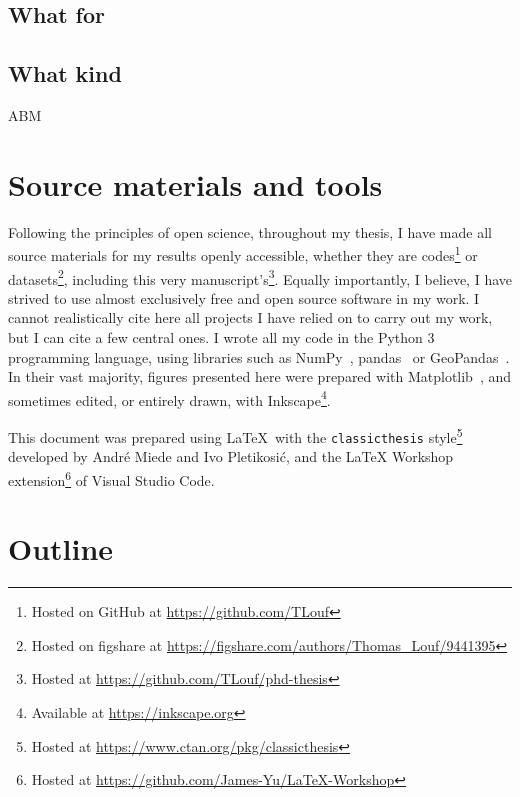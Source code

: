 \documentclass[../thesis.tex]{subfiles}
\begin{document}
\subsection{What for}

\subsection{What kind}



\ac{ABM}


\section{Source materials and tools}
Following the principles of open science, throughout my thesis, I have made all source
materials for my results openly accessible, whether they are codes\footnote{Hosted on
GitHub at \url{https://github.com/TLouf}} or datasets\footnote{Hosted on figshare at
\url{https://figshare.com/authors/Thomas_Louf/9441395}}, including this very
manuscript's\footnote{Hosted at \url{https://github.com/TLouf/phd-thesis}}. Equally importantly, I believe, I have strived to use almost exclusively free
and open source software in my work. I cannot realistically cite here all projects I
have relied on to carry out my work, but I can cite a few central ones. I wrote all my
code in the Python 3 programming language, using libraries such as
NumPy~\cite{HarrisArrayProgramming2020},
pandas~\cite{teamPandasdevPandas2020} or
GeoPandas~\cite{JordahlGeopandasGeopandas2020}. In their vast majority, figures
presented here were prepared with Matplotlib~\cite{HunterMatplotlib2D2007}, and
sometimes edited, or entirely drawn, with Inkscape\footnote{Available at
\url{https://inkscape.org}}.

This document was prepared using \LaTeX\ with the \texttt{classicthesis}
style\footnote{Hosted at \url{https://www.ctan.org/pkg/classicthesis}} developed by
Andr\'e Miede and Ivo Pletikosić, and the LaTeX Workshop extension\footnote{Hosted at
\url{https://github.com/James-Yu/LaTeX-Workshop}} of Visual Studio Code.


\section{Outline}
\end{document}
